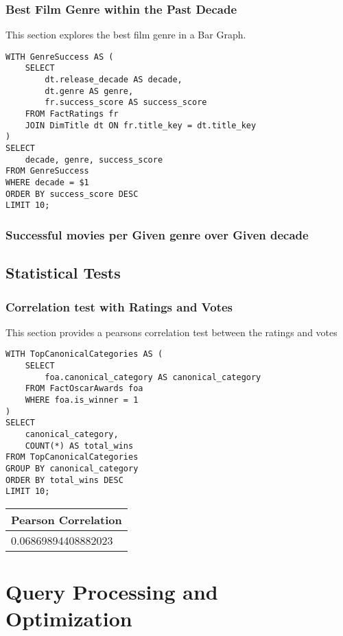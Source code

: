 \documentclass[sigconf, pbalance]{acmart}
\begin{document}
\subsubsection{Best Film Genre within the Past Decade}

This section explores the best film genre in a Bar Graph.
\begin{lstlisting}[style=SQLStyle]
WITH GenreSuccess AS (
    SELECT
        dt.release_decade AS decade,
        dt.genre AS genre,
        fr.success_score AS success_score
    FROM FactRatings fr
    JOIN DimTitle dt ON fr.title_key = dt.title_key
)
SELECT
    decade, genre, success_score
FROM GenreSuccess
WHERE decade = $1
ORDER BY success_score DESC
LIMIT 10;
\end{lstlisting}

\subsubsection{Successful movies per Given genre over Given decade}

\subsection{Statistical Tests}
\subsubsection{Correlation test with Ratings and Votes}
This section provides a pearsons correlation test between the ratings and votes 


\begin{lstlisting}[style=SQLStyle]
WITH TopCanonicalCategories AS (
    SELECT
        foa.canonical_category AS canonical_category
    FROM FactOscarAwards foa
    WHERE foa.is_winner = 1
)
SELECT
    canonical_category,
    COUNT(*) AS total_wins
FROM TopCanonicalCategories
GROUP BY canonical_category
ORDER BY total_wins DESC
LIMIT 10;
\end{lstlisting}
\begin{center}
\begin{tabular}{|p{8cm}|}
\hline
Pearson Correlation \\
\hline
0.06869894408882023 \\
\hline
\end{tabular}
\end{center}




\section{Query Processing and Optimization}
\end{document}
